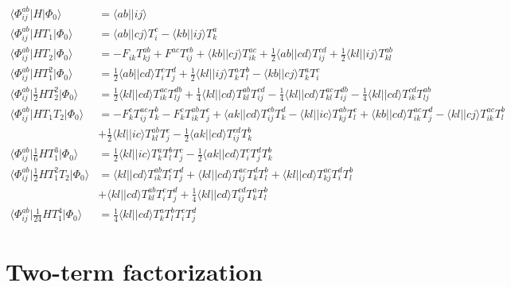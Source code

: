 \documentclass[letterpaper,12pt]{article}
\newcommand{\ket}[1]{\lvert #1 \rangle}
\newcommand{\bra}[1]{\langle #1 \vert}
\begin{document}
\begin{align*}
\bra{\Phi^{ab}_{ij}}H\ket{\Phi_0} &= \bra{ab}\ket{ij} \\
\bra{\Phi^{ab}_{ij}}HT_1\ket{\Phi_0} &= \bra{ab}\ket{cj}T^c_i-\bra{kb}\ket{ij}T^a_k \\
\bra{\Phi^{ab}_{ij}}HT_2\ket{\Phi_0} &= -F_{ik}T^{ab}_{kj} + F^{ac}T^{cb}_{ij} 
      + \bra{kb}\ket{cj}T^{ac}_{ik}+\frac{1}{2}\bra{ab}\ket{cd}T^{cd}_{ij}
      + \frac{1}{2}\bra{kl}\ket{ij}T^{ab}_{kl} \\
\bra{\Phi^{ab}_{ij}}HT_1^2\ket{\Phi_0} &= \frac{1}{2}\bra{ab}\ket{cd}T^c_iT^d_j
      + \frac{1}{2}\bra{kl}\ket{ij}T^a_kT^b_l - \bra{kb}\ket{cj}T^a_kT^c_i \\
\bra{\Phi^{ab}_{ij}}\frac{1}{2}HT_2^2\ket{\Phi_0} &= 
        \frac{1}{2}\bra{kl}\ket{cd}T^{ac}_{ik}T^{db}_{lj} 
      + \frac{1}{4}\bra{kl}\ket{cd}T^{ab}_{kl}T^{cd}_{ij} 
      - \frac{1}{4}\bra{kl}\ket{cd}T^{ac}_{kl}T^{db}_{ij} 
      - \frac{1}{4}\bra{kl}\ket{cd}T^{cd}_{ik}T^{ab}_{lj} \\
\bra{\Phi^{ab}_{ij}}HT_1T_2\ket{\Phi_0} &= -F^c_kT^{ac}_{ij}T^b_k - F^c_kT^{ab}_{ik}T^c_j
      + \bra{ak}\ket{cd}T^{cb}_{ij}T^d_k - \bra{kl}\ket{ic}T^{ab}_{kj}T^c_l
      + \bra{kb}\ket{cd}T^{ac}_{ik}T^d_j - \bra{kl}\ket{cj}T^{ac}_{ik}T^b_l \\
    & + \frac{1}{2}\bra{kl}\ket{ic}T^{ab}_{kl}T^c_j 
      - \frac{1}{2}\bra{ak}\ket{cd}T^{cd}_{ij}T^b_k \\
\bra{\Phi^{ab}_{ij}}\frac{1}{6}HT_1^3\ket{\Phi_0} &= 
        \frac{1}{2}\bra{kl}\ket{ic}T^a_kT^b_lT^c_j
      - \frac{1}{2}\bra{ak}\ket{cd}T^c_iT^d_jT^b_k  \\
\bra{\Phi^{ab}_{ij}}\frac{1}{2}HT_1^2T_2\ket{\Phi_0} &= 
        \bra{kl}\ket{cd}T^{ab}_{ik}T^c_lT^d_j + \bra{kl}\ket{cd}T^{ac}_{ij}T^d_kT^b_l 
      + \bra{kl}\ket{cd}T^{ac}_{kj}T^d_iT^b_l \\
    & + \bra{kl}\ket{cd}T^{ab}_{kl}T^c_iT^d_j + \frac{1}{4}\bra{kl}\ket{cd}T^{cd}_{ij}T^a_kT^b_l \\
\bra{\Phi^{ab}_{ij}}\frac{1}{24}HT_1^4\ket{\Phi_0} &= \frac{1}{4}\bra{kl}\ket{cd}T^a_kT^b_lT^c_iT^d_j
\end{align*}

\section{Two-term factorization}
\end{document}
